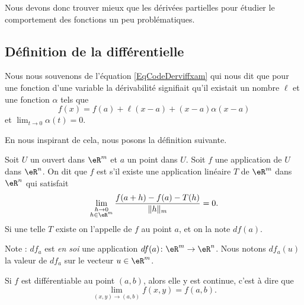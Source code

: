 Nous devons donc trouver mieux que les dérivées partielles pour étudier le comportement des fonctions un peu problématiques.

\subsection{Définition de la différentielle}

Nous nous souvenons de l'équation \eqref{EqCodeDerviffxam} qui nous dit que pour une fonction d'une variable la dérivabilité signifiait qu'il existait un nombre $\ell$ et une fonction $\alpha$ tels que
\begin{equation}
    f(x)=f(a)+\ell(x-a)+(x-a)\alpha(x-a)
\end{equation}
et $\lim_{t\to 0} \alpha(t)=0$. 

En nous inspirant de cela, nous posons la définition suivante.

\begin{definition}      \label{DefDifferentiellePta}
  Soit $U$ un ouvert dans $\eR^m$ et $a$ un point dans $U$. Soit $f$ une application de $U$ dans $\eR^n$. On dit que $f$ est  s'il existe une application linéaire $T$ de $\eR^m$ dans $\eR^n$ qui satisfait
  \begin{equation}	\label{EqCritereDefDiff}
      \lim_{\substack{h\to 0\\h\in \eR^m}}\frac{f(a+h)-f(a)-T(h)}{\|h\|_m}=0.    
  \end{equation}
  Si une telle $T$ existe on l'appelle  de $f$ au point $a$, et on la note $df(a)$. 
\end{definition}
Note : $df_a$ est \emph{en soi} une application $df(a)\colon \eR^m\to \eR^n$. Nous notons $df_a(u)$ la valeur de $df_a$ sur le vecteur $u\in\eR^m$.

\begin{proposition}
    Si $f$ est différentiable au point $(a,b)$, alors elle y est continue, c'est à dire que
    \begin{equation}
        \lim_{(x,y)\to(a,b)}f(x,y)=f(a,b).
    \end{equation}
\end{proposition}

